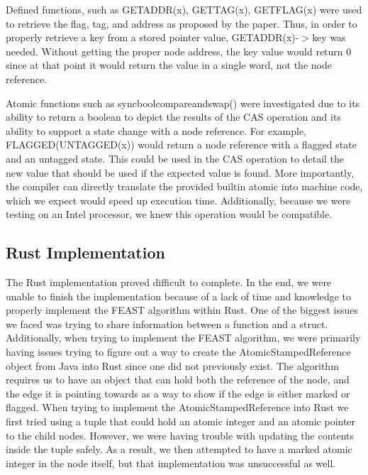 \documentclass[conference]{IEEEtran}
\begin{document}
Defined functions, such as GET\textunderscore ADDR(x), GET\textunderscore TAG(x), GET\textunderscore FLAG(x) were used to retrieve the {flag, tag, and address} as proposed by the paper. Thus, in order to properly retrieve a key from a stored pointer value, GET\textunderscore ADDR(x)-$>$key was needed. Without getting the proper node address, the key value would return 0 since at that point it would return the value in a single word, not the node reference. 

Atomic functions such as \textunderscore \textunderscore sync\textunderscore \textunderscore bool\textunderscore \textunderscore compare\textunderscore \textunderscore and\textunderscore \textunderscore swap() were investigated due to its ability to return a boolean to depict the results of the CAS operation and its ability to support a state change with a node reference. For example, FLAGGED(UNTAGGED(x)) would return a node reference with a flagged state and an untagged state. This could be used in the CAS operation to detail the new value that should be used if the expected value is found. More importantly, the compiler can directly translate the provided builtin atomic into machine code, which we expect would speed up execution time. Additionally, because we were testing on an Intel processor, we knew this operation would be compatible.


\subsection{Rust Implementation}\label{AA}
The Rust implementation proved difficult to complete. In the end, we were unable to finish the implementation because of a lack of time and knowledge to properly implement the FEAST algorithm within Rust. One of the biggest issues we faced was trying to share information between a function and a struct. Additionally, when trying to implement the FEAST algorithm, we were primarily having issues trying to figure out a way to create the AtomicStampedReference object from Java into Rust since one did not previously exist. The algorithm requires us to have an object that can hold both the reference of the node, and the edge it is pointing towards as a way to show if the edge is either marked or flagged. When trying to implement the AtomicStampedReference into Rust we first tried using a tuple that could hold an atomic integer and an atomic pointer to the child nodes. However, we were having trouble with updating the contents inside the tuple safely. As a result, we then attempted to have a marked atomic integer in the node itself, but that implementation was unsuccessful as well. 
\end{document}
